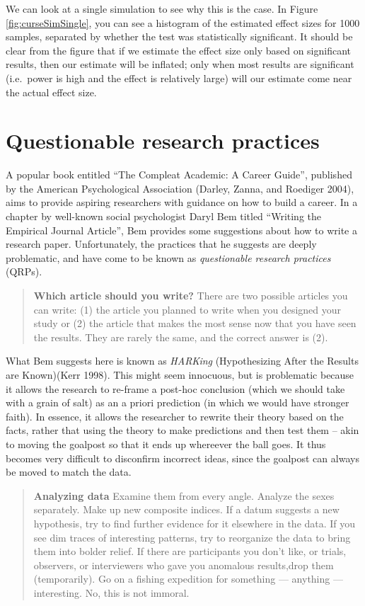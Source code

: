 \documentclass[]{book}
\theoremstyle{definition}
\theoremstyle{definition}
\theoremstyle{definition}
\theoremstyle{remark}
\begin{document}
We can look at a single simulation to see why this is the case. In
Figure \ref{fig:curseSimSingle}, you can see a histogram of the
estimated effect sizes for 1000 samples, separated by whether the test
was statistically significant. It should be clear from the figure that
if we estimate the effect size only based on significant results, then
our estimate will be inflated; only when most results are significant
(i.e.~power is high and the effect is relatively large) will our
estimate come near the actual effect size.

\section{Questionable research
practices}\label{questionable-research-practices}

A popular book entitled ``The Compleat Academic: A Career Guide'',
published by the American Psychological Association (Darley, Zanna, and
Roediger 2004), aims to provide aspiring researchers with guidance on
how to build a career. In a chapter by well-known social psychologist
Daryl Bem titled ``Writing the Empirical Journal Article'', Bem provides
some suggestions about how to write a research paper. Unfortunately, the
practices that he suggests are deeply problematic, and have come to be
known as \emph{questionable research practices} (QRPs).

\begin{quote}
\textbf{Which article should you write?} There are two possible articles
you can write: (1) the article you planned to write when you designed
your study or (2) the article that makes the most sense now that you
have seen the results. They are rarely the same, and the correct answer
is (2).
\end{quote}

What Bem suggests here is known as \emph{HARKing} (Hypothesizing After
the Results are Known)(Kerr 1998). This might seem innocuous, but is
problematic because it allows the research to re-frame a post-hoc
conclusion (which we should take with a grain of salt) as an a priori
prediction (in which we would have stronger faith). In essence, it
allows the researcher to rewrite their theory based on the facts, rather
that using the theory to make predictions and then test them -- akin to
moving the goalpost so that it ends up whereever the ball goes. It thus
becomes very difficult to disconfirm incorrect ideas, since the goalpost
can always be moved to match the data.

\begin{quote}
\textbf{Analyzing data} Examine them from every angle. Analyze the sexes
separately. Make up new composite indices. If a datum suggests a new
hypothesis, try to find further evidence for it elsewhere in the data.
If you see dim traces of interesting patterns, try to reorganize the
data to bring them into bolder relief. If there are participants you
don't like, or trials, observers, or interviewers who gave you anomalous
results,drop them (temporarily). Go on a fishing expedition for
something --- anything --- interesting. No, this is not immoral.
\end{quote}
\end{document}
